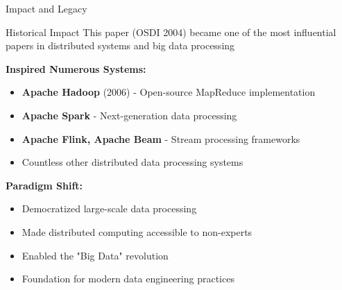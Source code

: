 \documentclass[aspectratio=169]{beamer}
\begin{document}
\begin{frame}{Impact and Legacy}
\begin{block}{Historical Impact}
This paper (OSDI 2004) became one of the most influential papers in distributed systems and big data processing
\end{block}

\vspace{0.3cm}

\textbf{Inspired Numerous Systems:}
\begin{itemize}
    \item \textbf{Apache Hadoop} (2006) - Open-source MapReduce implementation
    \item \textbf{Apache Spark} - Next-generation data processing
    \item \textbf{Apache Flink, Apache Beam} - Stream processing frameworks
    \item Countless other distributed data processing systems
\end{itemize}

\vspace{0.3cm}

\textbf{Paradigm Shift:}
\begin{itemize}
    \item Democratized large-scale data processing
    \item Made distributed computing accessible to non-experts
    \item Enabled the "Big Data" revolution
    \item Foundation for modern data engineering practices
\end{itemize}
\end{frame}
\end{document}
